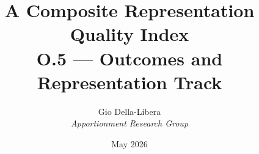 \documentclass[12pt]{article}
\title{\textbf{A Composite Representation Quality Index}\\[0.4em]
\large O.5 --- Outcomes and Representation Track}
\author{Gio Della-Libera \\ \textit{Apportionment Research Group}}
\date{May 2026}
\begin{document}
\maketitle
\begin{abstract}\end{abstract}





\end{document}
